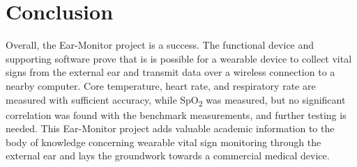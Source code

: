 \section{Conclusion}
Overall, the Ear-Monitor project is a success. The functional device and supporting software prove that is is possible for a wearable device to collect vital signs from the external ear and transmit data over a wireless connection to a nearby computer. Core temperature, heart rate, and respiratory rate are measured with sufficient accuracy, while SpO\textsubscript{2} was measured, but no significant correlation was found with the benchmark measurements, and further testing is needed. This Ear-Monitor project adds valuable academic information to the body of knowledge concerning wearable vital sign monitoring through the external ear and lays the groundwork towards a commercial medical device.